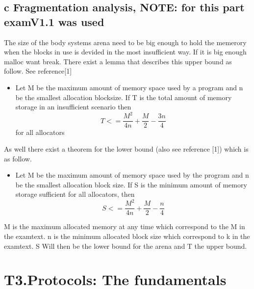 \documentclass[a4paper,12pt,danish]{report}
\begin{document}
\subsection{c Fragmentation analysis, NOTE: for this part examV1.1 was used}

The size of the body systems arena need to be big enough to hold the memerory
when the blocks in use is devided in the most insufficient way. If it is big
enough malloc want break. There exist a lemma that describes this upper bound as
follow. See reference[1]
\begin{itemize}
  \item Let M be the maximum amount of memory space used by a program and n be
  the smallest allocation blocksize. If T is the total amount of memory storage
  in an insufficient scenario then 
  $$T<=\frac{M^{2}}{4n} + \frac{M}2 - \frac{3n} 4$$
  for all allocators
\end{itemize}
As well there exist a theorem for the lower bound (also see reference [1])
which is as follow.

\begin{itemize}
  \item 
Let M be the maximum amount of memory space
used by the program and n be the smallest allocation block size.
If S is the minimum amount of memory storage sufficient for
all allocators, then
  $$S<=\frac{M^{2}}{4n} + \frac{M}2 - \frac{n} 4$$
\end{itemize}

M is the maximum allocated memory at any time which correspond to the M in the
examtext. n is the minimum allocated block size which correspond to k in the
examtext. S Will then be the lower bound for the arena and T the upper
bound.

\newpage
\section{T3.Protocols: The fundamentals}
\end{document}
